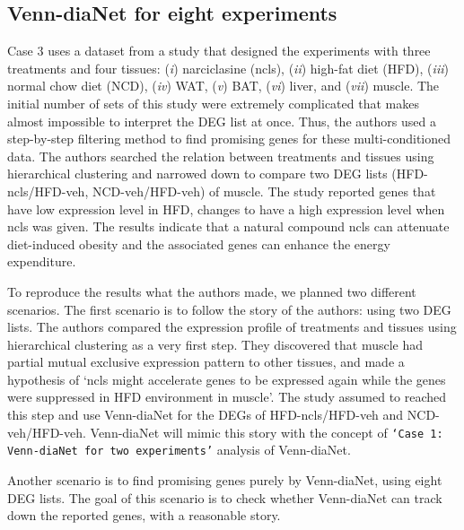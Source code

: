 \documentclass[oneside,phd]{snuthesis}
\begin{document}
\subsection{Venn-diaNet for eight experiments}

Case 3 uses a dataset from a study that designed the experiments with three treatments and four tissues: (\textit{i}) narciclasine (ncls), (\textit{ii}) high-fat diet (HFD), (\textit{iii}) normal chow diet (NCD), (\textit{iv}) WAT, (\textit{v}) BAT, (\textit{vi}) liver, and (\textit{vii}) muscle.
The initial number of sets of this study were extremely complicated that makes almost impossible to interpret the DEG list at once. 
Thus, the authors used a step-by-step filtering method to find promising genes for these multi-conditioned data. 
The authors searched the relation between treatments and tissues using hierarchical clustering and narrowed down to compare two DEG lists (HFD-ncls/HFD-veh, NCD-veh/HFD-veh) of muscle. 
The study reported genes that have low expression level in HFD, changes to have a high expression level when ncls was given. 
The results indicate that a natural compound ncls can attenuate diet-induced obesity and the associated genes can enhance the energy expenditure. 

To reproduce the results what the authors made, we planned two different scenarios. 
The first scenario is to follow the story of the authors: using two DEG lists. 
The authors compared the expression profile of treatments and tissues using hierarchical clustering as a very first step. 
They discovered that muscle had partial mutual exclusive expression pattern to other tissues, and made a hypothesis of `ncls might accelerate genes to be expressed again while the genes were suppressed in HFD environment in muscle'.
The study assumed to reached this step and use Venn-diaNet for the DEGs of HFD-ncls/HFD-veh and NCD-veh/HFD-veh.
Venn-diaNet will mimic this story with the concept of {\tt `Case 1: Venn-diaNet for two experiments'} analysis of Venn-diaNet.

Another scenario is to find promising genes purely by Venn-diaNet, using eight DEG lists. 
The goal of this scenario is to check whether Venn-diaNet can track down the reported genes, with a reasonable story.
\end{document}
